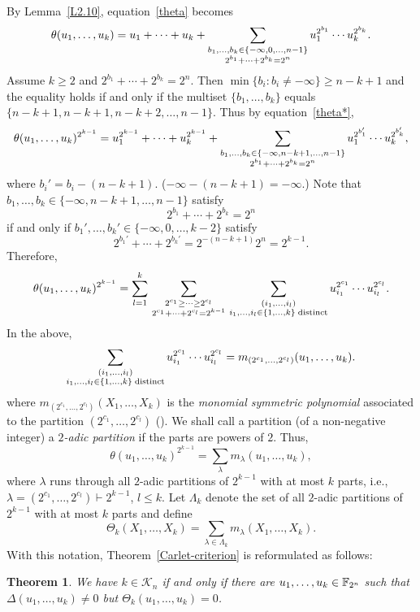 \documentclass{amsart}
\newtheorem{thm}{Theorem}[section]
\numberwithin{equation}{section}
\theoremstyle{definition}
\newcommand{\f}{\Bbb F}
\begin{document}
By Lemma~\ref{L2.10}, equation~\eqref{theta} becomes
\begin{equation}\label{theta*}
\theta(u_1,\dots,u_k)=u_1+\cdots+u_k+\sum_{\substack{b_1,\dots,b_k\in\{-\infty,0,\dots,n-1\}\cr 2^{b_1}+\cdots+2^{b_k}=2^n}}u_1^{2^{b_1}}\cdots u_k^{2^{b_k}}.
\end{equation}
Assume $k\ge 2$ and $2^{b_1}+\cdots+2^{b_k}=2^n$. Then $\min\{b_i:b_i\ne-\infty\}\ge n-k+1$ and the equality holds if and only if the multiset $\{b_1,\dots,b_k\}$ equals $\{n-k+1,n-k+1,n-k+2,\dots,n-1\}$. Thus by equation~\eqref{theta*},
\[
\theta(u_1,\dots,u_k)^{2^{k-1}}=u_1^{2^{k-1}}+\cdots+u_k^{2^{k-1}}+\sum_{\substack{b_1,\dots,b_k\in\{-\infty,n-k+1,\dots,n-1\}\cr 2^{b_1}+\cdots+2^{b_k}=2^n}}u_1^{2^{b_1'}}\cdots u_k^{2^{b_k'}},
\]
where $b_i'=b_i-(n-k+1)$. ($-\infty-(n-k+1)=-\infty$.) Note that $b_1,\dots,b_k\in\{-\infty,n-k+1,\dots,n-1\}$ satisfy 
\[
2^{b_1}+\cdots+2^{b_k}=2^n
\]
if and only if $b_1',\dots,b_k'\in\{-\infty,0,\dots,k-2\}$ satisfy
\[
2^{b_1'}+\cdots+2^{b_k'}=2^{-(n-k+1)}2^n=2^{k-1}.
\]
Therefore,
\[
\theta(u_1,\dots,u_k)^{2^{k-1}}=\sum_{l=1}^k\,\sum_{\substack{2^{c_1}\ge\cdots\ge 2^{c_l}\cr 2^{c_1}+\cdots+2^{c_l}=2^{k-1}}}\,\sum_{\substack{(i_1,\dots,i_l)\cr i_1,\dots,i_l\in\{1,\dots,k\}\;\text{distinct}}}u_{i_1}^{2^{c_1}}\cdots u_{i_l}^{2^{c_l}}.
\]
In the above,
\[
\sum_{\substack{(i_1,\dots,i_l)\cr i_1,\dots,i_l\in\{1,\dots,k\}\;\text{distinct}}}u_{i_1}^{2^{c_1}}\cdots u_{i_l}^{2^{c_l}}=m_{(2^{c_1},\dots,2^{c_l})}(u_1,\dots,u_k).
\]
where $m_{(2^{c_1},\dots,2^{c_l})}(X_1,\dots,X_k)$ is the {\em monomial symmetric polynomial} associated to the partition $(2^{c_1},\dots,2^{c_l})$ (\cite[I.2]{Macdonald-1995}). We shall call a partition (of a non-negative integer) a {\em $2$-adic partition} if the parts are powers of $2$. Thus,
\[
\theta(u_1,\dots,u_k)^{2^{k-1}}=\sum_\lambda m_\lambda(u_1,\dots,u_k),
\]
where $\lambda$ runs through all $2$-adic partitions of $2^{k-1}$ with at most $k$ parts, i.e., $\lambda=(2^{c_1},\dots,2^{c_l})\vdash 2^{k-1}$, $l\le k$. Let $\Lambda_k$ denote the set of all $2$-adic partitions of $2^{k-1}$ with at most $k$ parts and define
\[
\Theta_k(X_1,\dots,X_k)=\sum_{\lambda\in\Lambda_k}m_{\lambda}(X_1,\dots,X_k).
\]
With this notation, Theorem~\ref{Carlet-criterion} is reformulated as follows:

\begin{thm}\label{Theta}
We have $k\in\mathcal K_n$ if and only if there are $u_1,\dots,u_k\in\f_{2^n}$ such that $\Delta(u_1,\dots,u_k)\ne0$ but $\Theta_k(u_1,\dots,u_k)=0$.
\end{thm}
\end{document}
